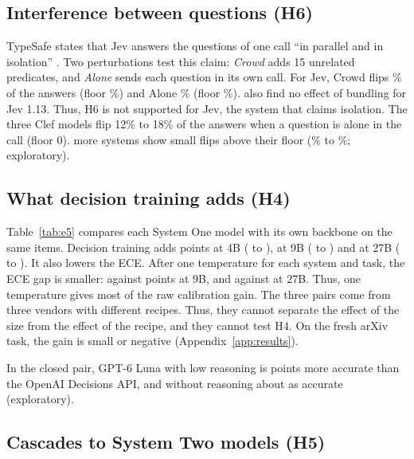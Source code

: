 \documentclass[11pt]{article}
\begin{document}
\subsection{Interference between questions (H6)}
\label{sec:interference}

TypeSafe states that Jev answers the questions of one call ``in parallel and in isolation'' \citep{typesafe2026docs}. Two perturbations test this claim: \emph{Crowd} adds 15 unrelated predicates, and \emph{Alone} sends each question in its own call. For Jev, Crowd flips \crowdedJev\% of the answers (floor \floorcrowdedJev\%) and Alone \aloneJev\% (floor \flooraloneJev\%). \citet{li2026beyond} also find no effect of bundling for Jev 1.13. Thus, H6 is not supported for Jev, the system that claims isolation. The three Clef models flip 12\% to 18\% of the answers when a question is alone in the call (floor 0). \nInterferenceOther{} more systems show small flips above their floor (\interferenceOtherMin\% to \interferenceOtherMax\%; exploratory).



\subsection{What decision training adds (H4)}
\label{sec:training}

Table~\ref{tab:e5} compares each System One model with its own backbone on the same items. Decision training adds \gainAbsFour{} points at 4B (\gainLoFour{} to \gainHiFour), \gainAbsNine{} at 9B (\gainLoNine{} to \gainHiNine) and \gainAbsTwentySeven{} at 27B (\gainLoTwentySeven{} to \gainHiTwentySeven). It also lowers the ECE. After one temperature for each system and task, the ECE gap is smaller: \eceTsDecNine{} against \eceTsBaseNine{} points at 9B, and \eceTsDecTwentySeven{} against \eceTsBaseTwentySeven{} at 27B. Thus, one temperature gives most of the raw calibration gain. The three pairs come from three vendors with different recipes. Thus, they cannot separate the effect of the size from the effect of the recipe, and they cannot test H4. On the fresh arXiv task, the gain is small or negative (Appendix~\ref{app:results}).

In the closed pair, GPT-6 Luna with low reasoning is \gainAbsClosed{} points more accurate than the OpenAI Decisions API, and without reasoning about as accurate (exploratory).

\subsection{Cascades to System Two models (H5)}
\label{sec:cascades}
\end{document}
